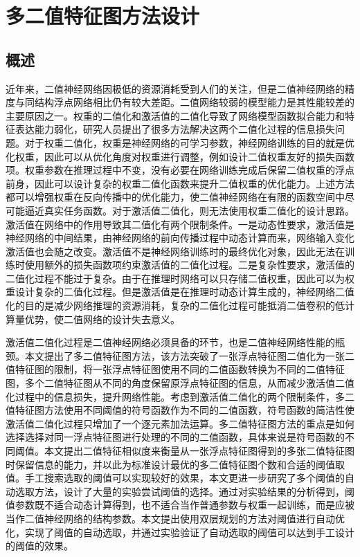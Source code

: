 
\chapter{多二值特征图方法设计}

\section{概述}

近年来，二值神经网络因极低的资源消耗受到人们的关注，但是二值神经网络的精度与同结构浮点网络相比仍有较大差距。二值网络较弱的模型能力是其性能较差的主要原因之一。权重的二值化和激活值的二值化导致了网络模型函数拟合能力和特征表达能力弱化，研究人员提出了很多方法解决这两个二值化过程的信息损失问题。对于权重二值化，权重是神经网络的可学习参数，神经网络训练的目的就是优化权重，因此可以从优化角度对权重进行调整，例如设计二值权重友好的损失函数项。权重参数在推理过程中不变，没有必要在网络训练完成后保留二值权重的浮点前身，因此可以设计复杂的权重二值化函数来提升二值权重的优化能力\cite{xu2021layerwisea}。上述方法都可以增强权重在反向传播中的优化能力，使二值神经网络在有限的函数空间中尽可能逼近真实任务函数。对于激活值二值化，则无法使用权重二值化的设计思路。激活值在网络中的作用导致其二值化有两个限制条件。一是动态性要求，激活值是神经网络的中间结果，由神经网络的前向传播过程中动态计算而来，网络输入变化激活值也会随之改变。激活值不是神经网络训练时的最终优化对象，因此无法在训练时使用额外的损失函数项约束激活值的二值化过程。二是复杂性要求，激活值的二值化过程不能过于复杂。由于在推理时网络可以只存储二值权重，因此可以为权重设计复杂的二值化过程。但是激活值是在推理时动态计算生成的，神经网络二值化的目的是减少网络推理的资源消耗，复杂的二值化过程可能抵消二值卷积的低计算量优势，使二值网络的设计失去意义。

激活值二值化过程是二值神经网络必须具备的环节，也是二值神经网络性能的瓶颈。本文提出了多二值特征图方法，该方法突破了一张浮点特征图二值化为一张二值特征图的限制，将一张浮点特征图使用不同的二值函数转换为不同的二值特征图，多个二值特征图从不同的角度保留原浮点特征图的信息，从而减少激活值二值化过程中的信息损失，提升网络性能。考虑到激活值二值化的两个限制条件，多二值特征图方法使用不同阈值的符号函数作为不同的二值函数，符号函数的简洁性使激活值二值化过程只增加了一个逐元素加法运算。多二值特征图方法的重点是如何选择选择对同一浮点特征图进行处理的不同的二值函数，具体来说是符号函数的不同阈值。本文提出二值特征相似度来衡量从一张浮点特征图得到的多张二值特征图时保留信息的能力，并以此为标准设计最优的多二值特征图个数和合适的阈值取值。手工搜索选取的阈值可以实现较好的效果，本文更进一步研究了多个阈值的自动选取方法，设计了大量的实验尝试阈值的选择。通过对实验结果的分析得到，阈值参数既不适合动态计算得到，也不适合当作普通参数与权重一起训练，而是应被当作二值神经网络的结构参数。本文提出使用双层规划的方法对阈值进行自动优化，实现了阈值的自动选取，并通过实验验证了自动选取的阈值可以达到手工设计的阈值的效果。

